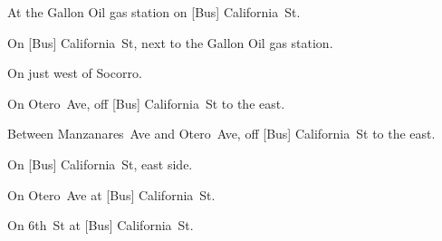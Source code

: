 
\begin{LocationList}

At the Gallon Oil gas station on [Bus]  California~St.

On [Bus]  California~St, next to the Gallon Oil gas station.

On  just west of Socorro.

On Otero~Ave, off [Bus]  California~St to the east.

Between Manzanares~Ave and Otero~Ave, off [Bus]  California~St to the east.

On [Bus]  California~St, east side.

On Otero~Ave at [Bus]  California~St.

\Location{\TruckService \Service}
On 6th~St at [Bus] California~St.

\end{LocationList}
